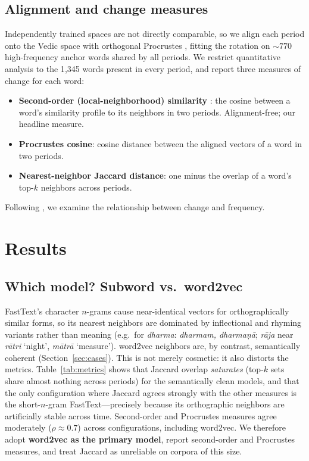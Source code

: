 \documentclass[11pt]{article}
\begin{document}
\subsection{Alignment and change measures}
Independently trained spaces are not directly comparable, so we align each period onto the Vedic space with orthogonal Procrustes \citep{hamilton2016diachronic}, fitting the rotation on ${\sim}\!770$ high-frequency anchor words shared by all periods. We restrict quantitative analysis to the 1{,}345 words present in every period, and report three measures of change for each word:
\begin{itemize}
  \item \textbf{Second-order (local-neighborhood) similarity} \citep{hamilton2016diachronic}: the cosine between a word's similarity profile to its neighbors in two periods. Alignment-free; our headline measure.
  \item \textbf{Procrustes cosine}: cosine distance between the aligned vectors of a word in two periods.
  \item \textbf{Nearest-neighbor Jaccard distance}: one minus the overlap of a word's top-$k$ neighbors across periods.
\end{itemize}
Following \citet{hamilton2016diachronic}, we examine the relationship between change and frequency.

\section{Results}
\label{sec:results}

\subsection{Which model? Subword vs.\ word2vec}
FastText's character $n$-grams cause near-identical vectors for orthographically similar forms, so its nearest neighbors are dominated by inflectional and rhyming variants rather than meaning (e.g.\ for \textit{dharma}: \textit{dharmam, dharma\d{n}\=a}; \textit{r\=aja} near \textit{r\=atri} `night', \textit{m\=atr\=a} `measure'). word2vec neighbors are, by contrast, semantically coherent (Section~\ref{sec:cases}). This is not merely cosmetic: it also distorts the metrics. Table~\ref{tab:metrics} shows that Jaccard overlap \emph{saturates} (top-$k$ sets share almost nothing across periods) for the semantically clean models, and that the only configuration where Jaccard agrees strongly with the other measures is the short-$n$-gram FastText---precisely because its orthographic neighbors are artificially stable across time. Second-order and Procrustes measures agree moderately ($\rho\!\approx\!0.7$) across configurations, including word2vec. We therefore adopt \textbf{word2vec as the primary model}, report second-order and Procrustes measures, and treat Jaccard as unreliable on corpora of this size.
\end{document}
